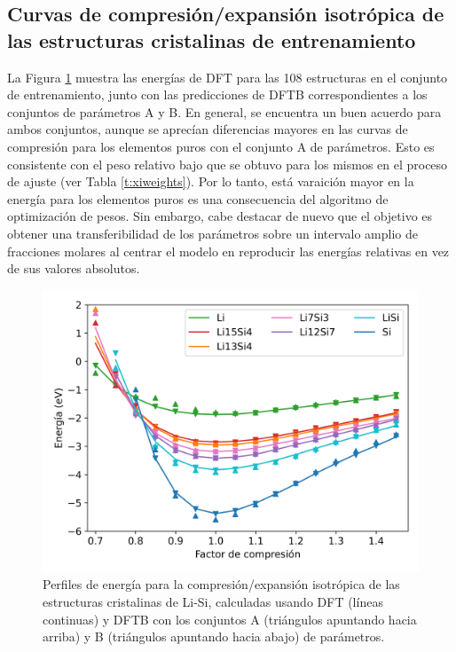 \subsection{Curvas de compresión/expansión isotrópica de las estructuras 
cristalinas de entrenamiento}

La Figura \ref{fig:compresion} muestra las energías de DFT para las 108 
estructuras en el conjunto de entrenamiento, junto con las predicciones de
DFTB correspondientes a los conjuntos de parámetros A y B. En general, se 
encuentra un buen acuerdo para ambos conjuntos, aunque se aprecían diferencias
mayores en las curvas de compresión para los elementos puros con el conjunto 
A de parámetros. Esto es consistente con el peso relativo bajo que se obtuvo
para los mismos en el proceso de ajuste (ver Tabla \ref{t:xiweights}). Por lo 
tanto, está varaición mayor en la energía para los elementos puros es una 
consecuencia del algoritmo de optimización de pesos. Sin embargo, cabe 
destacar de nuevo que el objetivo es obtener una transferibilidad de los 
parámetros sobre un intervalo amplio de fracciones molares al centrar el 
modelo en reproducir las energías relativas en vez de sus valores absolutos.

\begin{figure}[th]
    \centering
    \includegraphics[width=.7\textwidth]{Silicio/modelo/resultados/compresion/compresion.png}
    \caption{Perfiles de energía para la compresión/expansión isotrópica de las 
    estructuras cristalinas de Li-Si, calculadas usando DFT (líneas continuas) 
    y DFTB con los conjuntos A (triángulos apuntando hacia arriba) y B 
    (triángulos apuntando hacia abajo) de parámetros.}
    \label{fig:compresion}
\end{figure}
